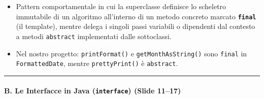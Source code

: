 \documentclass[11pt,a4paper]{article}
\newcommand{\passthrough}[1]{#1}
\providecommand{\tightlist}{\setlength{\itemsep}{0pt}\setlength{\parskip}{0pt}}
\begin{document}
\begin{itemize}
  \begin{itemize}
  \tightlist
  \item
    Pattern comportamentale in cui la superclasse definisce lo scheletro
    immutabile di un algoritmo all'interno di un metodo concreto marcato
    \textbf{\passthrough{\lstinline!final!}} (il template), mentre
    delega i singoli passi variabili o dipendenti dal contesto a metodi
    \passthrough{\lstinline!abstract!} implementati dalle sottoclassi.
  \item
    Nel nostro progetto: \passthrough{\lstinline!printFormat()!} e
    \passthrough{\lstinline!getMonthAsString()!} sono
    \passthrough{\lstinline!final!} in
    \passthrough{\lstinline!FormattedDate!}, mentre
    \passthrough{\lstinline!prettyPrint()!} è
    \passthrough{\lstinline!abstract!}.
  \end{itemize}
\end{itemize}

\begin{center}\rule{0.5\linewidth}{0.5pt}\end{center}

\paragraph{\texorpdfstring{B. Le Interfacce in Java (\texttt{interface})
(Slide
11--17)}{B. Le Interfacce in Java (interface) (Slide 11--17)}}\label{b.-le-interfacce-in-java-interface-slide-1117}
\end{document}
